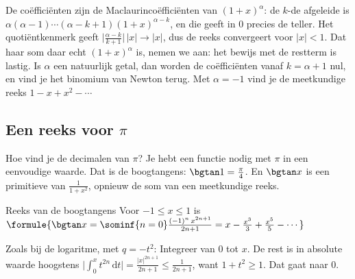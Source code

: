De coëfficiënten zijn de Maclaurincoëfficiënten van $(1+x)^\alpha$: de $k$-de afgeleide is $\alpha(\alpha-1)\cdots(\alpha-k+1)(1+x)^{\alpha-k}$, en die geeft in 0 precies de teller. Het quotiëntkenmerk geeft $\bigl|\tfrac{\alpha - k}{k+1}\bigr|\,|x| \to |x|$, dus de reeks convergeert voor $|x| < 1$. Dat haar som daar echt $(1+x)^\alpha$ is, nemen we aan: het bewijs met de restterm is lastig. Is $\alpha$ een natuurlijk getal, dan worden de coëfficiënten vanaf $k = \alpha + 1$ nul, en vind je het binomium van Newton terug. Met $\alpha = -1$ vind je de meetkundige reeks $1 - x + x^2 - \cdots$



\begin{oefeningen}
\end{oefeningen}

\subsection{Een reeks voor \texorpdfstring{$\pi$}{π}}

Hoe vind je de decimalen van $\pi$? Je hebt een functie nodig met $\pi$ in een eenvoudige waarde. Dat is de boogtangens: $\bgtan 1 = \tfrac\pi4$. En $\bgtan x$ is een primitieve van $\tfrac{1}{1 + x^2}$, opnieuw de som van een meetkundige reeks.

\begin{theorie}
\begin{stelling}{Reeks van de boogtangens}
Voor $-1 \leqslant x \leqslant 1$ is \quad $\formule{\bgtan x = \sominf{n=0} \frac{(-1)^n\,x^{2n+1}}{2n+1} = x - \frac{x^3}{3} + \frac{x^5}{5} - \cdots}$
\end{stelling}

\begin{bewijs}
Zoals bij de logaritme, met $q = -t^2$:
Integreer van 0 tot $x$. De rest is in absolute waarde hoogstens $\bigl|\int_0^x t^{2n}\,\mathrm{d}t\bigr| = \tfrac{|x|^{2n+1}}{2n+1} \leqslant \tfrac{1}{2n+1}$, want $1 + t^2 \geqslant 1$. Dat gaat naar 0.
\end{bewijs}
\end{theorie}

